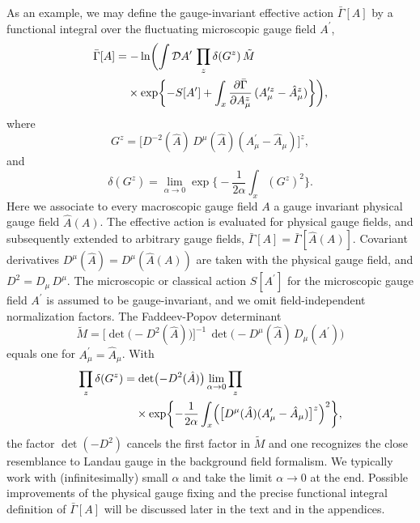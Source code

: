 \documentclass[twocolumn,aps,prd,amsmath,amssymb,preprintnumbers,longbibliography]{revtex4-1}
\numberwithin{equation}{section}
\newenvironment{alignedeqn}{\begin{equation}\begin{aligned}}{\end{aligned}\end{equation}\ignorespacesafterend}
\begin{document}
As an example, we may define the gauge-invariant effective action $\bar\Gamma[A]$ by a functional integral over the fluctuating microscopic gauge field $A^\prime$,
\begin{alignedeqn}\label{eqn:AA1}
	\bar\Gamma[A]
	&= -\ln\biggl(\int \mathcal{D} A^\prime \, \prod_z \delta(G^z) \, \tilde{M}\\
	&\hphantom{{}=}\times \exp\biggl\{-S[A^\prime] + \int_x \frac{\partial \bar\Gamma}{\partial A_\mu^z} \, (A_\mu^{\prime z} - \hat{A}_\mu^z)\biggr\}\biggr),
\end{alignedeqn}
where
\begin{equation}\label{eqn:AA2}
	G^z
	= \bigl[D^{-2}(\hat{A}) \, D^\mu(\hat{A}) (A_\mu^\prime - \hat{A}_\mu)\bigr]^z,
\end{equation}
and
\begin{equation}\label{eqn:AA3}
	\delta(G^z)
	= \lim_{\alpha \to 0} \exp\biggl\{-\frac{1}{2 \alpha} \int_x (G^z)^2\biggr\}.
\end{equation}
Here we associate to every macroscopic gauge field $A$ a gauge invariant physical gauge field $\hat{A}(A)$. The effective action is evaluated for physical gauge fields, and subsequently extended to arbitrary gauge fields, $\bar{\Gamma}[A]=\bar{\Gamma}[\hat{A}(A)]$. Covariant derivatives $D^\mu(\hat{A})=D^{\mu}(\hat{A}(A))$ are taken with the physical gauge field, and $D^2 = D_\mu \, D^\mu$. The microscopic or classical action $S[A^\prime]$ for the microscopic gauge field $A^\prime$ is assumed to be gauge-invariant, and we omit field-independent normalization factors. The Faddeev-Popov determinant
\begin{equation}\label{eqn:3A}
	\tilde{M}
	= \bigl[\det\bigl(-D^2(\hat{A})\bigr)\bigr]^{-1} \, \det\bigl(-D^\mu(\hat{A}) \, D_\mu(A^\prime)\bigr)
\end{equation}
equals one for $A_\mu^\prime = \hat{A}_\mu$. With
\begin{align}\label{eqn:AA4}
	\prod_z \delta(G^z)
	&= \det\bigl(-D^2(\hat{A})\bigr) \lim_{\alpha \to 0} \prod_z\\
	&\hphantom{{}=} \times \exp\biggl\{-\frac{1}{2 \alpha} \int_x \Bigl(\bigl[D^\mu(\hat{A}) (A_\mu^\prime - \hat{A}_\mu)\bigr]^z\Bigr)^2\biggr\},\notag
\end{align}
the factor $\det(-D^2)$ cancels the first factor in $\tilde{M}$ and one recognizes the close resemblance to Landau gauge in the background field formalism. We typically work with (infinitesimally) small $\alpha$ and take the limit $\alpha \to 0$ at the end. Possible improvements of the physical gauge fixing and the precise functional integral definition of $\bar\Gamma[A]$ will be discussed later in the text and in the appendices.
\end{document}
